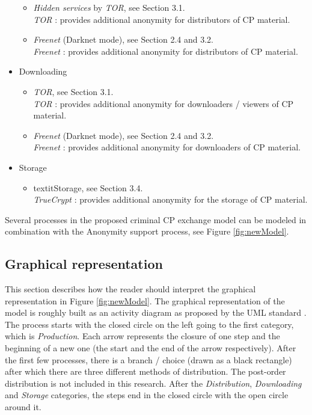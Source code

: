 \documentclass{sig-alternate-br}
\begin{document}
\begin{itemize}
\begin{itemize}
			\item \textit{Hidden services} by \textit{TOR}, see Section 3.1.\\
				\textit{TOR} \cite{dingledine2004tor}: provides additional anonymity for distributors of CP material.
			\item \textit{Freenet} (Darknet mode), see Section 2.4 and 3.2.\\
				\textit{Freenet} \cite{clarke2001freenet, callanan2009internet}: provides additional anonymity for distributors of CP material.
		\end{itemize}
	\item Downloading
		\begin{itemize}
			\item \textit{TOR}, see Section 3.1.\\
				\textit{TOR} \cite{dingledine2004tor}: provides additional anonymity for downloaders / viewers of CP material.
			\item \textit{Freenet} \cite{clarke2001freenet,callanan2009internet} (Darknet mode), see Section 2.4 and 3.2.\\
				\textit{Freenet} \cite{clarke2001freenet,callanan2009internet}: provides additional anonymity for downloaders of CP material.
		\end{itemize}
	\item Storage
		\begin{itemize}
			\item textit{Storage}, see Section 3.4.\\
				\textit{TrueCrypt} \cite{miao2010research}: provides additional anonymity for the storage of CP material.
		\end{itemize}
\end{itemize}
Several processes in the proposed criminal CP exchange model can be modeled in combination with the Anonymity support process, see Figure \ref{fig:newModel}.

\subsection{Graphical representation}
This section describes how the reader should interpret the graphical representation in Figure \ref{fig:newModel}. The graphical representation of the model is roughly built as an activity diagram as proposed by the UML standard \cite{eriksson2000business}. The process starts with the closed circle on the left going to the first category, which is \textit{Production}. Each arrow represents the closure of one step and the beginning of a new one (the start and the end of the arrow respectively). After the first few processes, there is a branch / choice (drawn as a black rectangle) after which there are three different methods of distribution. The post-order distribution is not included in this research. After the \textit{Distribution}, \textit{Downloading} and \textit{Storage} categories, the steps end in the closed circle with the open circle around it.
\end{document}
